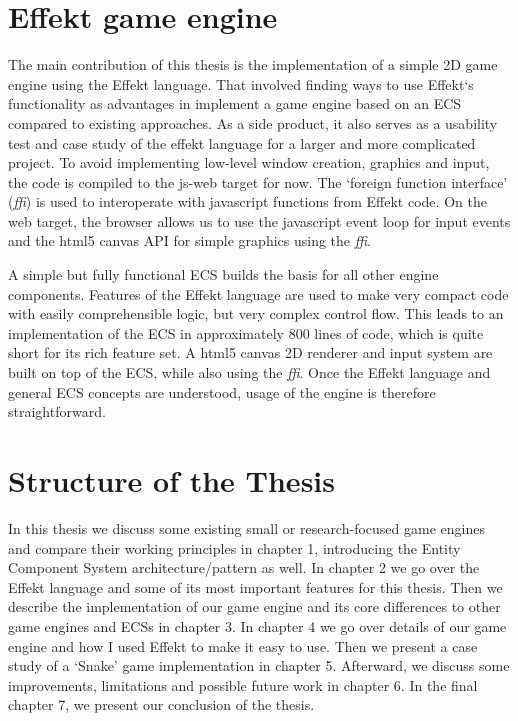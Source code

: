 \section{Effekt game engine}

The main contribution of this thesis is the implementation of a simple 2D game engine using the Effekt language. That involved finding ways to use Effekt`s functionality as advantages in implement a game engine based on an ECS compared to existing approaches. As a side product, it also serves as a usability test and case study of the effekt language for a larger and more complicated project. To avoid implementing low-level window creation, graphics and input, the code is compiled to the \textsf{js-web} target for now. The `foreign function interface' (\textit{ffi}) is used to interoperate with javascript functions from Effekt code. On the web target, the browser allows us to use the javascript event loop for input events and the html5 \textsf{canvas} API for simple graphics using the \textit{ffi}.

A simple but fully functional ECS builds the basis for all other engine components. Features of the Effekt language are used to make very compact code with easily comprehensible logic, but very complex control flow. This leads to an implementation of the ECS in approximately 800 lines of code, which is quite short for its rich feature set. A html5 \textsf{canvas} 2D renderer and input system are built on top of the ECS, while also using the \textit{ffi}. Once the Effekt language and general ECS concepts are understood, usage of the engine is therefore straightforward.

\section{Structure of the Thesis}

In this thesis we discuss some existing small or research-focused game engines and compare their working principles in chapter 1, introducing the Entity Component System architecture/pattern as well. In chapter 2 we go over the Effekt language and some of its most important features for this thesis. Then we describe the implementation of our game engine and its core differences to other game engines and ECSs in chapter 3. In chapter 4 we go over details of our game engine and how I used Effekt to make it easy to use. Then we present a case study of a `Snake' game implementation in chapter 5. Afterward, we discuss some improvements, limitations and possible future work in chapter 6. In the final chapter 7, we present our conclusion of the thesis.
